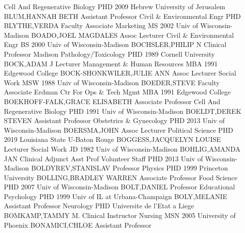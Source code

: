 \documentclass[
]{article}
\begin{document}
\textbar{}  \textbar Cell And Regenerative Biology
\textbar PHD 2009 Hebrew University of Jerusalem \textbar BLUM,HANNAH
BETH \textbar Assistant Professor \textbar{}  \textbar Civil
\& Environmental Engr \textbar PHD \textbar BLYTHE,VERDA
\textbar Faculty Associate \textbar{}  \textbar Marketing
\textbar MS 2002 Univ of Wisconsin-Madison \textbar BOADO,JOEL MAGDALES
\textbar Assoc Lecturer \textbar{}  \textbar Civil \&
Environmental Engr \textbar BS 2000 Univ of Wisconsin-Madison
\textbar BOCHSLER,PHILIP N \textbar Clinical Professor \textbar{}
 \textbar Madison Pathology/Toxicology \textbar PHD 1989
Cornell University \textbar BOCK,ADAM J \textbar Lecturer \textbar{}
 \textbar Management \& Human Resources \textbar MBA 1991
Edgewood College \textbar BOCK-SHONKWILER,JULIE ANN \textbar Assoc
Lecturer \textbar{}  \textbar Social Work \textbar MSW 1988
Univ of Wisconsin-Madison \textbar BOEDER,STEVE \textbar Faculty
Associate \textbar{}  \textbar Erdman Ctr For Ops \& Tech
Mgmt \textbar MBA 1991 Edgewood College \textbar BOEKHOFF-FALK,GRACE
ELISABETH \textbar Associate Professor \textbar{} 
\textbar Cell And Regenerative Biology \textbar PHD 1991 Univ of
Wisconsin-Madison \textbar BOELDT,DEREK STEVEN \textbar Assistant
Professor \textbar{}  \textbar Obstetrics \& Gynecology
\textbar PHD 2013 Univ of Wisconsin-Madison \textbar BOERSMA,JOHN
\textbar Assoc Lecturer \textbar{}  \textbar Political
Science \textbar PHD 2019 Louisiana State U-Baton Rouge
\textbar BOGGESS,JACQUELYN LOUISE \textbar Lecturer \textbar{}
 \textbar Social Work \textbar JD 1982 Univ of
Wisconsin-Madison \textbar BOHLIG,AMANDA JAN \textbar Clinical Adjunct
Asst Prof \textbar{}  \textbar Volunteer Staff \textbar PHD
2013 Univ of Wisconsin-Madison \textbar BOLDYREV,STANISLAV
\textbar Professor \textbar{}  \textbar Physics \textbar PHD
1999 Princeton University \textbar BOLLING,BRADLEY WARREN
\textbar Associate Professor \textbar{}  \textbar Food
Science \textbar PHD 2007 Univ of Wisconsin-Madison \textbar BOLT,DANIEL
\textbar Professor \textbar{}  \textbar Educational
Psychology \textbar PHD 1999 Univ of IL at Urbana-Champaign
\textbar BOLY,MELANIE \textbar Assistant Professor \textbar{}
 \textbar Neurology \textbar PHD Universite de l'Etat a Liege
\textbar BOMKAMP,TAMMY M. \textbar Clinical Instructor \textbar{}
 \textbar Nursing \textbar MSN 2005 University of Phoenix
\textbar BONAMICI,CHLOE \textbar Assistant Professor \textbar{}
\end{document}
